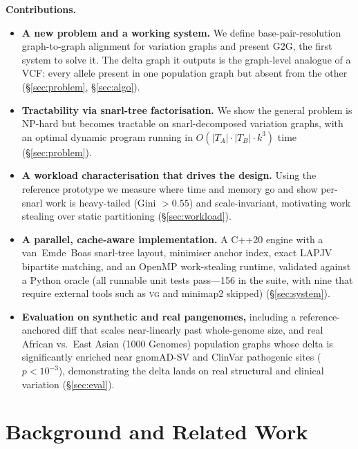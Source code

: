 \documentclass[conference]{IEEEtran}
\theoremstyle{plain}
\theoremstyle{definition}
\begin{document}
\smallskip\noindent\textbf{Contributions.}
\begin{itemize}
\item \textbf{A new problem and a working system.} We define base-pair-resolution
graph-to-graph alignment for variation graphs and present \textsc{G2G}, the
first system to solve it. The delta graph it outputs is the graph-level analogue
of a VCF: every allele present in one population graph but absent from the other
(\S\ref{sec:problem}, \S\ref{sec:algo}).
\item \textbf{Tractability via snarl-tree factorisation.} We show the general
problem is NP-hard but becomes tractable on snarl-decomposed variation graphs,
with an optimal dynamic program running in $O(|T_A|\cdot|T_B|\cdot k^3)$ time
(\S\ref{sec:problem}).
\item \textbf{A workload characterisation that drives the design.} Using the
reference prototype we measure where time and memory go and show per-snarl work
is heavy-tailed (Gini $>0.55$) and scale-invariant, motivating work stealing
over static partitioning (\S\ref{sec:workload}).
\item \textbf{A parallel, cache-aware implementation.} A C++20 engine with a
van~Emde~Boas snarl-tree layout, minimiser anchor index, exact LAPJV bipartite
matching, and an OpenMP work-stealing runtime, validated against a Python oracle
(all runnable unit tests pass---156 in the suite, with nine that require external
tools such as \textsc{vg} and minimap2 skipped) (\S\ref{sec:system}).
\item \textbf{Evaluation on synthetic and real pangenomes,} including a
reference-anchored diff that scales near-linearly past whole-genome size, and real
African vs.\ East Asian (1000 Genomes) population graphs whose delta is
significantly enriched near gnomAD-SV and ClinVar pathogenic sites
($p<10^{-3}$), demonstrating the delta lands on real structural and clinical
variation (\S\ref{sec:eval}).
\end{itemize}

\section{Background and Related Work}
\label{sec:background}
\end{document}
